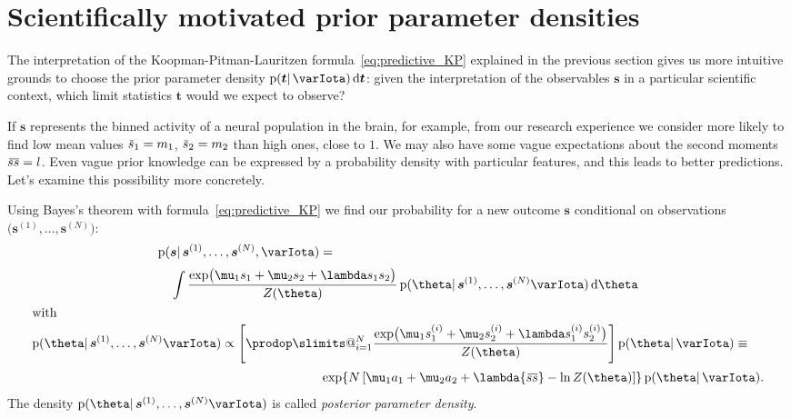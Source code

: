 \documentclass[\ifafour a4paper,12pt,\else a5paper,10pt,\fi%
onecolumn,oneside,article,%
british%
]{memoir}
\makeatletter
\theoremstyle{remark}
\theoremstyle{innote}
\def\prod{\DOTSI\prodop\slimits@}
\newcommand*{\di}{\mathrm{d}}%
\newcommand*{\pf}{\mathrm{p}}%
\renewcommand*{\|}{\mathpunct{|}}
\newcommand*{\widebar}[1]{{\mkern1.5mu\skew{2}\overline{\mkern-1.5mu#1\mkern-1.5mu}\mkern 1.5mu}}
\newcommand*{\yI}{\varIota}
\newcommand*{\ys}{\bm{s}}
\newcommand*{\yso}[1]{\ys^{(#1)}}
\newcommand*{\ysso}[1]{s^{(#1)}}
\newcommand*{\la}{\lambda}
\newcommand*{\yth}{\bm{\theta}}
\newcommand*{\yt}{\bm{t}}
\newcommand*{\yavv}{\widebar{s}}
\newcommand*{\ycv}{\widebar{ss}}
\makeatother
\begin{document}
\section{Scientifically motivated prior parameter densities}
\label{sec:other_priors}

The interpretation of the Koopman-Pitman-Lauritzen
formula~\eqref{eq:predictive_KP} explained in the previous section gives us
more intuitive grounds to choose the prior parameter density
$\pf(\yt \|\yI)\,\di\yt$: given the interpretation of the observables $\ys$
in a particular scientific context, which limit statistics $\yt$ would we
expect to observe?

If $\ys$ represents the binned activity of a neural population in the
brain, for example, from our research experience we consider more likely to
find low mean values $\yavv_1=m_1$, $\yavv_2=m_2$ than high ones, close to
$1$. We may also have some vague expectations about the second moments
$\ycv=l$. Even vague prior knowledge can be expressed by a probability
density with particular features, and this leads to better predictions.
Let's examine this possibility more concretely.

\bigskip


Using Bayes's theorem with formula~\eqref{eq:predictive_KP} we find our
probability for a new outcome $\ys$ conditional on observations
$\bigl( \yso{1}, \dotsc,\yso{N} \bigr)$:
\begin{subequations}    \label{eq:conditional_prediction}
  \begin{gather}
    \begin{multlined}[][0.9\linewidth]
      \pf(\ys \| \yso{1}, \dotsc, \yso{N}, \yI ) ={}\\[\jot]
      \int
      \frac{  \exp\bigl(
        \mu_1 s_1 + \mu_2 s_2 + \la s_1 s_2
        \bigr) }{Z(\yth)}
      \,
      \pf(\yth \| \yso{1},\dotsc,\yso{N} \yI) \, \di\yth
    \end{multlined}
    \\
    \shortintertext{with}
    \begin{multlined}[0.95\linewidth]
    \pf(\yth \| \yso{1},\dotsc,\yso{N} \yI)
    \propto
    \Biggl[  \prod_{i=1}^{N}
    \frac{  \exp\bigl(
      \mu_1 \ysso{i}_1 + \mu_2 \ysso{i}_2 + \la \ysso{i}_1 \ysso{i}_2
      \bigr) }{Z(\yth)}
    \Biggr]\,
    \pf(\yth \| \yI) 
\equiv{}\\[\jot]
     \exp\{N\,[
      \mu_1 a_1 + \mu_2 a_2 + \la \ycv -\ln Z(\yth)]\}\,
    \pf(\yth \| \yI).
    \end{multlined}
  \end{gather}
\end{subequations}
The density $\pf(\yth \| \yso{1},\dotsc,\yso{N} \yI)$ is called
\emph{posterior parameter density}.
\end{document}
